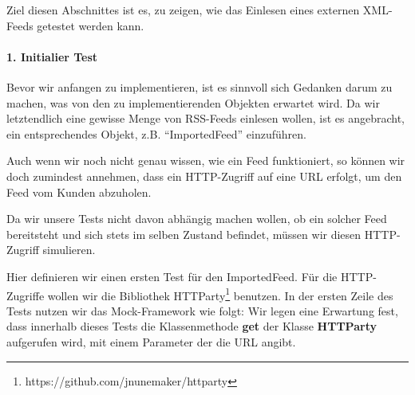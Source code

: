 Ziel diesen Abschnittes ist es, zu zeigen, wie das Einlesen eines externen XML-Feeds getestet werden kann.

\paragraph{1. Initialier Test}

Bevor wir anfangen zu implementieren, ist es sinnvoll sich Gedanken darum zu machen, was von den zu implementierenden Objekten erwartet wird. Da wir letztendlich eine gewisse Menge von RSS-Feeds einlesen wollen, ist es angebracht, ein entsprechendes Objekt, z.B. "`ImportedFeed"' einzuführen.

Auch wenn wir noch nicht genau wissen, wie ein Feed funktioniert, so können wir doch zumindest annehmen, dass ein HTTP-Zugriff auf eine URL erfolgt, um den Feed vom Kunden abzuholen.

Da wir unsere Tests nicht davon abhängig machen wollen, ob ein solcher Feed bereitsteht und sich stets im selben Zustand befindet, müssen wir diesen HTTP-Zugriff simulieren.

\begin{ruby}[label=test/test\_imported\_feed.rb]
    
  

   

    
\end{ruby}





Hier definieren wir einen ersten Test für den ImportedFeed. Für die HTTP-Zugriffe wollen wir die Bibliothek HTTParty\footnote{https://github.com/jnunemaker/httparty} benutzen. In der ersten Zeile des Tests nutzen wir das Mock-Framework wie folgt: Wir legen eine Erwartung fest, dass innerhalb dieses Tests die Klassenmethode \textbf{get} der Klasse \textbf{HTTParty} aufgerufen wird, mit einem Parameter der die URL angibt.

